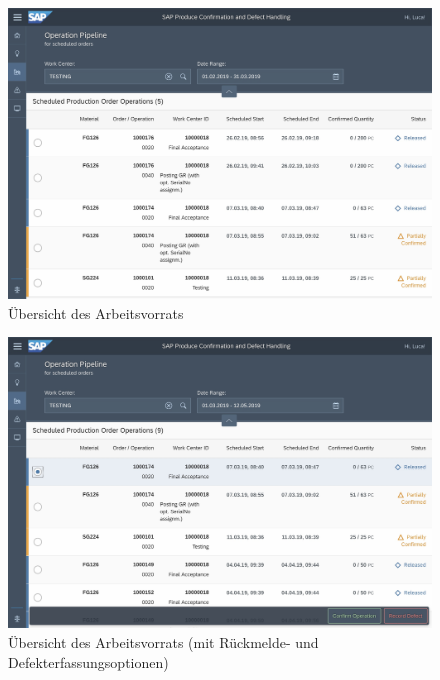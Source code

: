 \begin{figure}[H]
	\centering 
	\includegraphics[width=1.2\textwidth, angle =90 ]{img/Arbeitsvorrat.jpg}	
	\caption[Übersicht des Arbeitsvorrats (ohne Buttons)]{\label{fig:arbeitsvorrat}Übersicht des Arbeitsvorrats 
	}
\end{figure}
\begin{figure}[H]
	\centering 
	\includegraphics[width=1.2\textwidth, angle =90 ]{img/Arbeitsvorrat mit buttons.jpg}	
	\caption[Übersicht des Arbeitsvorrats (mit Buttons)]{\label{fig:arbeitsvorrat2}Übersicht des Arbeitsvorrats (mit Rückmelde- und Defekterfassungsoptionen)
	}
\end{figure}


